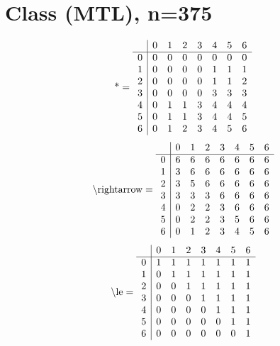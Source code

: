 \documentclass[11pt]{article}
\begin{document}
\section{Class (MTL), n=375}
\[\text{*} = 
\begin{array}{r | r r r r r r r}
 & 0 & 1 & 2 & 3 & 4 & 5 & 6 \\ \hline
0 & 0 & 0 & 0 & 0 & 0 & 0 & 0 \\
1 & 0 & 0 & 0 & 0 & 1 & 1 & 1 \\
2 & 0 & 0 & 0 & 0 & 1 & 1 & 2 \\
3 & 0 & 0 & 0 & 0 & 3 & 3 & 3 \\
4 & 0 & 1 & 1 & 3 & 4 & 4 & 4 \\
5 & 0 & 1 & 1 & 3 & 4 & 4 & 5 \\
6 & 0 & 1 & 2 & 3 & 4 & 5 & 6 \\
\end{array}
\]
\[\text{\textbackslash rightarrow} = 
\begin{array}{r | r r r r r r r}
 & 0 & 1 & 2 & 3 & 4 & 5 & 6 \\ \hline
0 & 6 & 6 & 6 & 6 & 6 & 6 & 6 \\
1 & 3 & 6 & 6 & 6 & 6 & 6 & 6 \\
2 & 3 & 5 & 6 & 6 & 6 & 6 & 6 \\
3 & 3 & 3 & 3 & 6 & 6 & 6 & 6 \\
4 & 0 & 2 & 2 & 3 & 6 & 6 & 6 \\
5 & 0 & 2 & 2 & 3 & 5 & 6 & 6 \\
6 & 0 & 1 & 2 & 3 & 4 & 5 & 6 \\
\end{array}
\]
\[\text{\textbackslash le} = 
\begin{array}{r | r r r r r r r}
 & 0 & 1 & 2 & 3 & 4 & 5 & 6 \\ \hline
0 & 1 & 1 & 1 & 1 & 1 & 1 & 1 \\
1 & 0 & 1 & 1 & 1 & 1 & 1 & 1 \\
2 & 0 & 0 & 1 & 1 & 1 & 1 & 1 \\
3 & 0 & 0 & 0 & 1 & 1 & 1 & 1 \\
4 & 0 & 0 & 0 & 0 & 1 & 1 & 1 \\
5 & 0 & 0 & 0 & 0 & 0 & 1 & 1 \\
6 & 0 & 0 & 0 & 0 & 0 & 0 & 1 \\
\end{array}
\]
\end{document}
